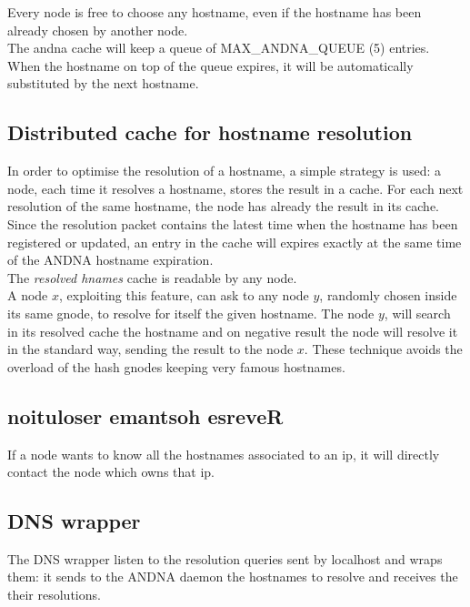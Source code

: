 \documentclass[a4paper]{article}
\begin{document}
Every node is free to choose any hostname, even if the hostname has been
already chosen by another node.\\
The andna cache will keep a queue of MAX\_ANDNA\_QUEUE (5) entries.
When the hostname on top of the queue expires, it will be automatically
substituted by the next hostname.


\subsection{Distributed cache for hostname resolution}

In order to optimise the resolution of a hostname, a simple strategy is
used: a node, each time it resolves a hostname, stores the result in a
cache. For each next resolution of the same hostname, the node has already
the result in its cache.\\
Since the resolution packet contains the latest time when the hostname has
been registered or updated, an entry in the cache will
expires exactly at the same time of the ANDNA hostname expiration.\\

The \emph{resolved hnames} cache is readable by any node.\\
A node $x$, exploiting this feature, can ask to any node $y$, randomly chosen
inside its same gnode, to resolve for itself the given hostname.
The node $y$, will search in its resolved cache the hostname and on negative
result the node will resolve it in the standard way, sending the result to
the node $x$.
These technique avoids the overload of the hash gnodes keeping very famous
hostnames.

\subsection{noituloser emantsoh esreveR}

If a node wants to know all the hostnames associated to an ip, it will
directly contact the node which owns that ip.

\subsection{DNS wrapper}

The DNS wrapper listen to the resolution queries sent by localhost and wraps
them: it sends to the ANDNA daemon the hostnames to resolve and receives 
the their resolutions.\\
\end{document}
